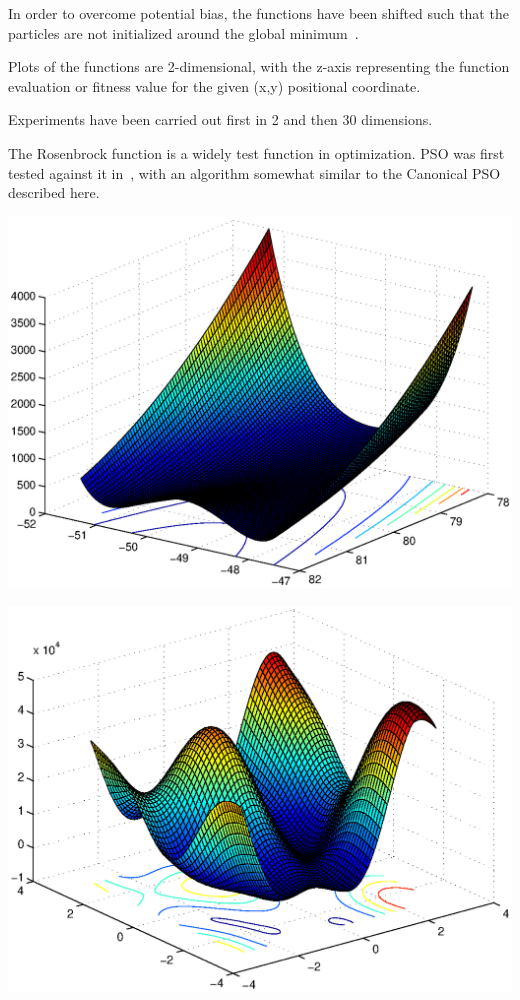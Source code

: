 \documentclass{csfourzero}
\newenvironment{Figure}
  {\par\medskip\noindent\minipage{\linewidth}}
  {\endminipage\par\medskip}
\begin{document}
In order to overcome potential bias, the functions have been shifted such that
the particles are not initialized around the global
minimum~\cite{Monson:2005fn}.

Plots of the functions are 2-dimensional, with the z-axis representing the
function evaluation or fitness value for the given (x,y) positional coordinate.

Experiments have been carried out first in 2 and then 30 dimensions.

The Rosenbrock function is a widely test function in optimization. PSO was first
tested against it in~\cite{Shi:1999je}, with an algorithm somewhat similar to
the Canonical PSO described here.

\begin{multicols}{2}

\begin{Figure}
  \centering
  \includegraphics[width=\linewidth]{../functions/rosenbrock_shifted.eps}
\end{Figure}

\begin{Figure}
  \centering
  \includegraphics[width=\linewidth]{../functions/schwefel.eps}
\end{Figure}


\end{multicols}
\end{document}
